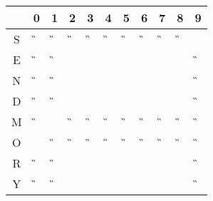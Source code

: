 \begin{tabular}{|c|c|c|c|c|c|c|c|c|c|c|}\hline
  & 0 & 1 & 2 & 3 & 4 & 5 & 6 & 7 & 8 & 9 \\ \hline
S &\G &\G &\G &\G &\G &\G &\G &\G &\G &\A \\ \hline
E &\G &\G &   &   &   &   &   &   &   &\G \\ \hline
N &\G &\G &   &   &   &   &   &   &   &\G \\ \hline
D &\G &\G &   &   &   &   &   &   &   &\G \\ \hline
M &\G &\A &\G &\G &\G &\G &\G &\G &\G &\G \\ \hline
O &\A &\G &\G &\G &\G &\G &\G &\G &\G &\G \\ \hline
R &\G &\G &   &   &   &   &   &   &   &\G \\ \hline
Y &\G &\G &   &   &   &   &   &   &   &\G \\ \hline
\end{tabular}
